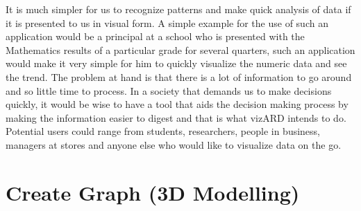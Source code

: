 \documentclass[a4paper,12pt]{article}
\begin{document}
It is much simpler for us to recognize patterns and make quick analysis of data if it is presented to us in visual form. A simple example for the use of such an application would be a principal at a school who is presented with the Mathematics results of a particular grade for several quarters, such an application would make it very simple for him to quickly visualize the numeric data and see the trend.
\newline
\newline
The problem at hand is that there is a lot of information to go around and so little time to process. In a society that demands us to make decisions quickly, it would be wise to have a tool that aids the decision making process by making the information easier to digest and that is what vizARD intends to do.
\newline
\newline
Potential users could range from students, researchers, people in business, managers at stores and anyone else who would like to visualize data on the go.
		
\newpage

\section{Create Graph (3D Modelling)}
\end{document}
